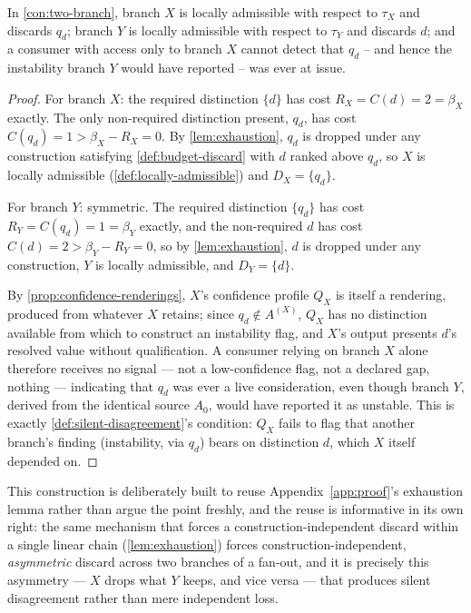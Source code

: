 \begin{proposition}
\label{prop:witness-silent-disagreement}
In \cref{con:two-branch}, branch $X$ is locally admissible with respect
to $\tau_X$ and discards $q_d$; branch $Y$ is locally admissible with
respect to $\tau_Y$ and discards $d$; and a consumer with access only to
branch $X$ cannot detect that $q_d$ -- and hence the instability branch
$Y$ would have reported -- was ever at issue.
\end{proposition}

\begin{proof}
For branch $X$: the required distinction $\{d\}$ has cost $R_X = C(d) = 2
= \beta_X$ exactly. The only non-required distinction present, $q_d$, has
cost $C(q_d) = 1 > \beta_X - R_X = 0$. By \cref{lem:exhaustion}, $q_d$ is
dropped under any construction satisfying \cref{def:budget-discard} with
$d$ ranked above $q_d$, so $X$ is locally admissible
(\cref{def:locally-admissible}) and $D_X = \{q_d\}$.

For branch $Y$: symmetric. The required distinction $\{q_d\}$ has cost
$R_Y = C(q_d) = 1 = \beta_Y$ exactly, and the non-required $d$ has cost
$C(d) = 2 > \beta_Y - R_Y = 0$, so by \cref{lem:exhaustion}, $d$ is
dropped under any construction, $Y$ is locally admissible, and $D_Y =
\{d\}$.

By \cref{prop:confidence-renderings}, $X$'s confidence profile $Q_X$ is
itself a rendering, produced from whatever $X$ retains; since $q_d \notin
A^{(X)}$, $Q_X$ has no distinction available from which to construct an
instability flag, and $X$'s output presents $d$'s resolved value without
qualification. A consumer relying on branch $X$ alone therefore receives
no signal --- not a low-confidence flag, not a declared gap, nothing ---
indicating that $q_d$ was ever a live consideration, even though branch
$Y$, derived from the identical source $A_0$, would have reported it as
unstable. This is exactly \cref{def:silent-disagreement}'s condition:
$Q_X$ fails to flag that another branch's finding (instability, via
$q_d$) bears on distinction $d$, which $X$ itself depended on.
\end{proof}

This construction is deliberately built to reuse
Appendix~\ref{app:proof}'s exhaustion lemma rather than argue the point
freshly, and the reuse is informative in its own right: the same
mechanism that forces a construction-independent discard within a single
linear chain (\cref{lem:exhaustion}) forces construction-independent,
\emph{asymmetric} discard across two branches of a fan-out, and it is
precisely this asymmetry --- $X$ drops what $Y$ keeps, and vice versa ---
that produces silent disagreement rather than mere independent loss.

